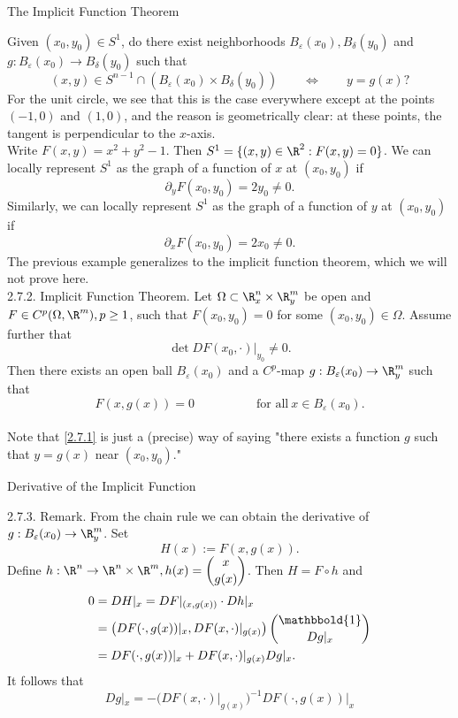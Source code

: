 \documentclass[smaller,hyperref={CJKbookmarks=true}]{beamer}
\begin{document}
\begin{frame}{The Implicit Function Theorem}
\begin{spacing}{1}
Given $(x_0,y_0)\in S^1$, do there exist neighborhoods $B_\varepsilon(x_0),B_\delta(y_0)$ and $g:B_\varepsilon(x_0)\to B_\delta(y_0)$ such that
\[(x,y)\in S^{n-1}\cap\left(B_\varepsilon(x_0)\times B_\delta(y_0)\right)\qquad\Leftrightarrow\qquad
y=g(x)?\]
For the unit circle, we see that this is the case everywhere except at the points $(-1,0)$ and $(1,0)$, and the reason is geometrically clear: at these points, the tangent is perpendicular to the $x$-axis.\\[5pt]
Write $F(x,y)=x^2+y^2-1$. Then $S^1=\{(x,y)\in\R^2:F(x,y)=0\}$. We can locally represent $S^1$ as the graph of a function of $x$ at $(x_0,y_0)$ if
\[\partial_y F(x_0,y_0)=2y_0\neq0.\]
Similarly, we can locally represent $S^1$ as the graph of a function of $y$ at $(x_0,y_0)$ if
\[\partial_x F(x_0,y_0)=2x_0\neq0.\]
\newpage
The previous example generalizes to the implicit function theorem, which
we will not prove here.\\[5pt]
\alert{2.7.2. Implicit Function Theorem.} Let $\Omega\subset\R_x^n\times\R_y^m$ be open and $F\in C^p(\Omega,\R^m),p\geq1$, such that $F(x_0,y_0)=0$ for some $(x_0,y_0)\in\Omega$. Assume further that
\[\det DF(x_0,\cdot)|_{y_0}\neq0.\]
Then there exists an open ball $B_\varepsilon(x_0)$ and a $C^p$-map $g:B_\varepsilon(x_0)\to\R_y^m$ such that
\setcounter{equation}{0}
\begin{equation}\label{2.7.1}
  F(x,g(x))=0\qquad\qquad\quad
  \text{for all}~x\in B_\varepsilon(x_0).
\end{equation}
 \\[17pt]
Note that \eqref{2.7.1} is just a (precise) way of saying "there exists a function $g$ such that $y=g(x)$ near $(x_0,y_0)$."
\end{spacing}
\end{frame}
\begin{frame}[t]{Derivative of the Implicit Function}
\begin{spacing}{1.2}
\alert{2.7.3. Remark.} From the chain rule we can obtain the derivative of $g:B_\varepsilon(x_0)\to\R_y^m$. Set
\[H(x):=F(x,g(x)).\]
Define $\displaystyle h:\R^n\to\R^n\times\R^m,h(x)=\binom{x}{g(x)}$. Then $H=F\circ h$ and
\begin{equation*}
  \begin{split}
     0 &=DH|_x=DF|_{(x,g(x))}\cdot Dh|_x  \\
       &=\left(DF(\cdot,g(x))|_x,DF(x,\cdot)|_{g(x)}\right)\binom{\mathbbold{1}}{Dg|_x}  \\
       &=DF(\cdot,g(x))|_x+DF(x,\cdot)|_{g(x)}Dg|_x.
  \end{split}
\end{equation*}
It follows that
\begin{equation}\label{2.7.2}
  Dg|_x=-(DF(x,\cdot)|_{g(x)})^{-1}DF(\cdot,g(x))|_x
\end{equation}
\end{spacing}
\end{frame}
\end{document}
